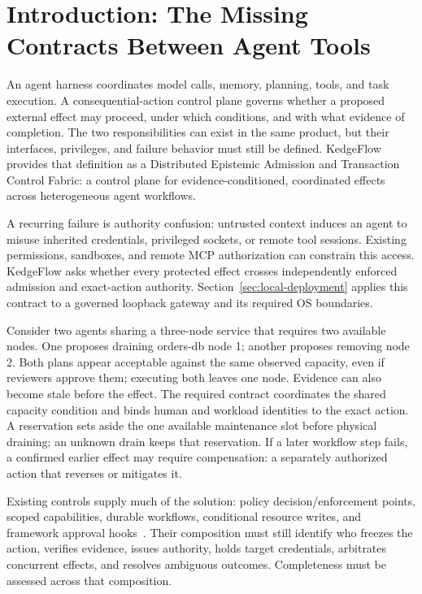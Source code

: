 \section{Introduction: The Missing Contracts Between Agent Tools}
\label{sec:boundary}

An agent harness coordinates model calls, memory, planning, tools, and task execution. A consequential-action control plane governs whether a proposed external effect may proceed, under which conditions, and with what evidence of completion. The two responsibilities can exist in the same product, but their interfaces, privileges, and failure behavior must still be defined. KedgeFlow provides that definition as a Distributed Epistemic Admission and Transaction Control Fabric: a control plane for evidence-conditioned, coordinated effects across heterogeneous agent workflows.

A recurring failure is authority confusion: untrusted context induces an agent to misuse inherited credentials, privileged sockets, or remote tool sessions. Existing permissions, sandboxes, and remote MCP authorization can constrain this access. KedgeFlow asks whether every protected effect crosses independently enforced admission and exact-action authority. Section~\ref{sec:local-deployment} applies this contract to a governed loopback gateway and its required OS boundaries.

Consider two agents sharing a three-node service that requires two available nodes. One proposes draining orders-db node 1; another proposes removing node 2. Both plans appear acceptable against the same observed capacity, even if reviewers approve them; executing both leaves one node. Evidence can also become stale before the effect. The required contract coordinates the shared capacity condition and binds human and workload identities to the exact action. A reservation sets aside the one available maintenance slot before physical draining; an unknown drain keeps that reservation. If a later workflow step fails, a confirmed earlier effect may require compensation: a separately authorized action that reverses or mitigates it.

Existing controls supply much of the solution: policy decision/enforcement points, scoped capabilities, durable workflows, conditional resource writes, and framework approval hooks~\cite{nist800207,miller2003capabilities,langgraph2026}. Their composition must still identify who freezes the action, verifies evidence, issues authority, holds target credentials, arbitrates concurrent effects, and resolves ambiguous outcomes. Completeness must be assessed across that composition.


